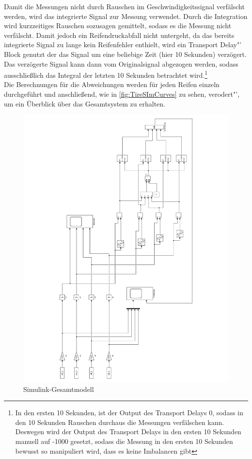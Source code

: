 \vspace{-1em}
Damit die Messungen nicht durch Rauschen im Geschwindigkeitssignal verfälscht werden, wird das integrierte Signal zur Messung verwendet. Durch die Integration wird kurzzeitiges Rauschen sozusagen gemittelt, sodass es die Messung nicht verfälscht. Damit jedoch ein Reifendruckabfall nicht untergeht, da das bereits integrierte Signal zu lange kein Reifenfehler enthielt, wird ein  \glqq Transport Delay"' Block genutzt der das Signal um eine beliebige Zeit (hier 10 Sekunden) verzögert. Das verzögerte Signal kann dann vom Originalsignal abgezogen werden, sodass ausschließlich das Integral der letzten 10 Sekunden betrachtet wird.\footnote{In den ersten 10 Sekunden, ist der Output des Transport Delays 0, sodass in den 10 Sekunden Rauschen durchaus die Messungen verfälschen kann. Deswegen wird der Output des Transport Delays in den ersten 10 Sekunden manuell auf -1000 gesetzt, sodass die Messung in den ersten 10 Sekunden bewusst so manipuliert wird, dass es keine Imbalancen gibt }\\
Die Berechnungen für die Abweichungen werden für jeden Reifen einzeln durchgeführt und anschließend, wie in \autoref{fig:TireSImCurves} zu sehen, \glqq verodert"', um ein Überblick über das Gesamtsystem zu erhalten.\\


\begin{figure}[H]
	\centering
	\includegraphics[height=0.95\textheight]{../Graphiken/TireSimCurvesLandscape.pdf}
	\caption{Simulink-Gesamtmodell}
	\label{fig:TireSImCurves}
\end{figure}

